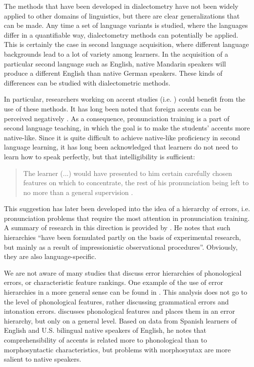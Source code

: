 \documentclass[output=paper]{LSP/langsci}
\begin{document}
The methods that have been developed in dialectometry have not been widely applied to other domains of linguistics, but there are clear generalizations that can be made. Any time a set of language variants is studied, where the languages differ in a quantifiable way, dialectometry methods can potentially be applied. This is certainly the case in second language acquisition, where different language backgrounds lead to a lot of variety among learners. In the acquisition of a particular second language such as English, native Mandarin speakers will produce a different English than native German speakers. These kinds of differences can be studied with dialectometric methods.

In particular, researchers working on accent studies (i.e. \citealt{wells_accents_1982, waniek-klimczak_issues_2008}) could benefit from the use of these methods. It has long been noted that foreign accents can be perceived negatively \citep{ryan_social_1983}. As a consequence, pronunciation training is a part of second language teaching, in which the goal is to make the students' accents more native-like. Since it is quite difficult to achieve native-like proficiency in second language learning, it has long been acknowledged that learners do not need to learn how to speak perfectly, but that intelligibility is sufficient:
\begin{quote}
The learner (...) would have presented to him certain carefully chosen features on which to concentrate, the rest of his pronunciation being left to no more than a general supervision \citep[93]{abercrombie_problems_1956}.
\end{quote}
This suggestion has later been developed into the idea of a hierarchy of errors, i.e. pronunciation problems that require the most attention in pronunciation training. A summary of research in this direction is provided by \citet[7-15]{van_den_doel_evaluation_2006}. He notes that such hierarchies ``have been formulated partly on the basis of experimental research, but mainly as a result of impressionistic observational procedures''. Obviously, they are also language-specific.

We are not aware of many studies that discuss error hierarchies of phonological errors, or characteristic feature rankings. One example of the use of error hierarchies in a more general sense can be found in \citet{rifkin_error_1995}. This analysis does not go to the level of phonological features, rather discussing grammatical errors and intonation errors. \citet{gynan_comprehension_1985} discusses phonological features and places them in an error hierarchy, but only on a general level. Based on data from Spanish learners of English and U.S. bilingual native speakers of English, he notes that comprehensibility of accents is related more to phonological than to morphosyntactic characteristics, but problems with morphosyntax are more salient to native speakers.
\end{document}
